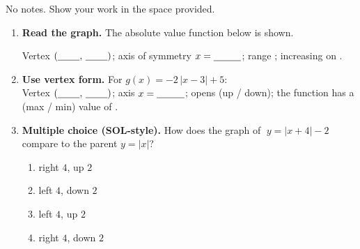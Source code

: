 \documentclass[10pt]{article}
\newcommand{\lgrid}[4]{%
  \draw[step=1, linegray!40, very thin] (#1,#3) grid (#2,#4);
  \draw[->, semithick, charcoal] (#1,0)--(#2,0) node[below right, font=\scriptsize]{$x$};
  \draw[->, semithick, charcoal] (0,#3)--(0,#4) node[left, font=\scriptsize]{$y$};}
\begin{document}

\vspace{0.10in}

No notes. Show your work in the space provided.

\begin{enumerate}[leftmargin=1.8em, itemsep=14pt]
  \item \textbf{Read the graph.} The absolute value function below is shown.
        \begin{center}
        \end{center}
        Vertex $(\blank{0.8cm},\,\blank{0.8cm})$; \quad axis of symmetry $x=\blank{1.0cm}$; \quad
        range \blank{1.8cm}; \quad increasing on \blank{2.0cm}.

  \item \textbf{Use vertex form.} For $g(x) = -2\,|x-3| + 5$:
        \\[4pt]
        Vertex $(\blank{0.8cm},\,\blank{0.8cm})$; \quad axis $x=\blank{1.0cm}$; \quad opens
        \blank{1.4cm} (up / down); \quad the function has a \blank{1.2cm} (max / min) value of
        \blank{0.9cm}.

  \item \textbf{Multiple choice (SOL-style).} How does the graph of $\;y=|x+4|-2\;$ compare to the
        parent $y=|x|$?
        \begin{enumerate}[label=(\Alph*), leftmargin=1.8em, itemsep=2pt]
          \item right $4$, up $2$
          \item left $4$, down $2$
          \item left $4$, up $2$
          \item right $4$, down $2$
        \end{enumerate}
\end{enumerate}
\end{document}

